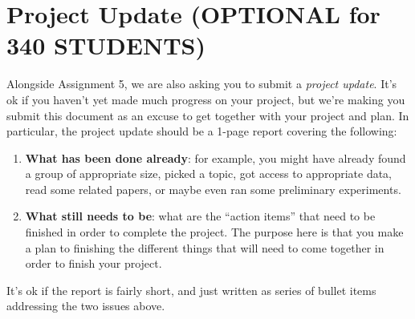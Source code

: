 \documentclass{article}
\def\enum#1{\begin{enumerate}#1\end{enumerate}}
\begin{document}
\section*{Project Update (OPTIONAL for 340 STUDENTS)}

Alongside Assignment 5, we are also asking you to submit a \emph{project update}. It's ok if you haven't yet made much progress on your project, but we're making you submit this document as an excuse to get together with your project and plan. In particular, the project update should be a 1-page report covering the following:
\enum{
\item \textbf{What has been done already}: for example, you might have already found a group of appropriate size, picked a topic, got access to appropriate data, read some related papers, or maybe even ran some preliminary experiments.
\item \textbf{What still needs to be}: what are the ``action items'' that need to be finished in order to complete the project. The purpose here is that you make a plan to finishing the different things that will need to come together in order to finish your project.
}
It's ok if the report is fairly short, and just written as series of bullet items addressing the two issues above.
\end{document}
